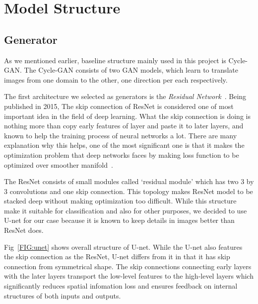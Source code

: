 \chapter{Model Structure}\label{Ch:Model}

\section{Generator}

As we mentioned earlier, baseline structure mainly used in this project is Cycle-GAN. The Cycle-GAN consists of two GAN models, which learn to translate images from one domain to the other, one direction per each respectively. 

The first architecture we selected as generators is the \emph{Residual Network}~\cite{resnet}. Being published in 2015, The skip connection of ResNet is considered one of most important idea in the field of deep learning. What the skip connection is doing is nothing more than copy early features of layer and paste it to later layers, and known to help the training process of neural networks a lot. There are many explanation why this helps, one of the most significant one is that it makes the optimization problem that deep networks faces by making loss function to be optimized over smoother manifold~\cite{li2018visualizing}.

The ResNet consists of small modules called `residual module' which has two 3 by 3 convolutions and one skip connection. This topology makes ResNet model to be stacked deep without making optimization too difficult. While this structure make it suitable for classification and also for other purposes, we decided to use U-net for our case because it is known to keep details in images better than ResNet does.

Fig~\ref{FIG:unet} shows overall structure of U-net. While the U-net also features the skip connection as the ResNet, U-net differs from it in that it has skip connection from symmetrical shape. The skip connections connecting early layers with the later layers transport the low-level features to the high-level layers which significantly reduces spatial infomation loss and ensures feedback on internal structures of both inputs and outputs.

